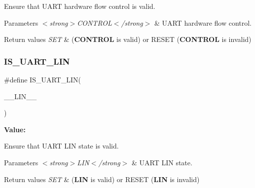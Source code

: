 Ensure that U\+A\+RT hardware flow control is valid. 


\begin{DoxyParams}{Parameters}
{\em $<$strong$>$\+C\+O\+N\+T\+R\+O\+L$<$/strong$>$} & U\+A\+RT hardware flow control. \\
\hline
\end{DoxyParams}

\begin{DoxyRetVals}{Return values}
{\em S\+ET} & ({\bfseries{C\+O\+N\+T\+R\+OL}} is valid) or R\+E\+S\+ET ({\bfseries{C\+O\+N\+T\+R\+OL}} is invalid) \\
\hline
\end{DoxyRetVals}
\mbox{\label{group___u_a_r_t___private___macros_ga13d7f9876db68d9d6316204a8a2588de}} 
\subsubsection{\texorpdfstring{IS\_UART\_LIN}{IS\_UART\_LIN}}
{\footnotesize\ttfamily \#define I\+S\+\_\+\+U\+A\+R\+T\+\_\+\+L\+IN(\begin{DoxyParamCaption}\item[{}]{\+\_\+\+\_\+\+L\+I\+N\+\_\+\+\_\+ }\end{DoxyParamCaption})}

{\bfseries Value\+:}
\begin{DoxyCode}{0}

\end{DoxyCode}


Ensure that U\+A\+RT L\+IN state is valid. 


\begin{DoxyParams}{Parameters}
{\em $<$strong$>$\+L\+I\+N$<$/strong$>$} & U\+A\+RT L\+IN state. \\
\hline
\end{DoxyParams}

\begin{DoxyRetVals}{Return values}
{\em S\+ET} & ({\bfseries{L\+IN}} is valid) or R\+E\+S\+ET ({\bfseries{L\+IN}} is invalid) \\
\hline
\end{DoxyRetVals}
\mbox{\label{group___u_a_r_t___private___macros_gac8ac0d0dc7fad5edf53150ce05d902ee}} 

